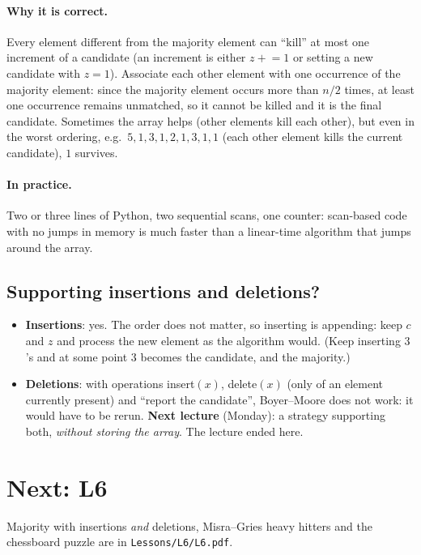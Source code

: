 \documentclass[11pt,a4paper]{article}
\theoremstyle{definition}\newtheorem*{definition}{Definition}
\begin{document}
\paragraph{Why it is correct.} Every element different from the majority element can ``kill'' at most one increment of a candidate (an increment is either
$z\mathrel{+}=1$ or setting a new candidate with $z=1$). Associate each other element with one occurrence of the majority element: since the majority
element occurs more than $n/2$ times, at least one occurrence remains unmatched, so it cannot be killed and it is the final candidate. Sometimes the array helps
(other elements kill each other), but even in the worst ordering, e.g.\ $5,1,3,1,2,1,3,1,1$ (each other element kills the current candidate), $1$ survives.

\paragraph{In practice.} Two or three lines of Python, two sequential scans, one counter: scan-based code with no jumps in memory is much faster than a linear-time
algorithm that jumps around the array.

\subsection{Supporting insertions and deletions?}
\begin{itemize}[nosep]
\item \textbf{Insertions}: yes. The order does not matter, so inserting is appending: keep $c$ and $z$ and process the new element as the algorithm would.
      (Keep inserting $3$'s and at some point $3$ becomes the candidate, and the majority.)
\item \textbf{Deletions}: with operations insert$(x)$, delete$(x)$ (only of an element currently present) and ``report the candidate'', Boyer--Moore does not work:
      it would have to be rerun. \textbf{Next lecture} (Monday): a strategy supporting both, \emph{without storing the array}. The lecture ended here.
\end{itemize}

\section*{Next: L6}
Majority with insertions \emph{and} deletions, Misra--Gries heavy hitters and the chessboard puzzle are in \texttt{Lessons/L6/L6.pdf}.
\end{document}
